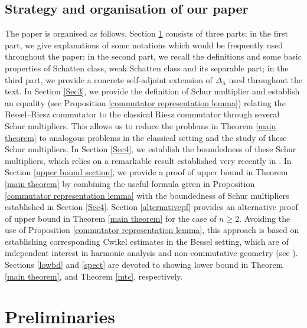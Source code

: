 \documentclass[12pt]{amsart}
\begin{document}
\subsection{Strategy and organisation of our paper}
The paper is organised as follows. Section \ref{Secpre} consists of three parts: in the first part, we give explanations of some notations which would be frequently used throughout the paper; in the second part, we recall the definitions and some basic properties of Schatten class, weak Schatten class and its separable part; in the third part, we provide a concrete self-adjoint extension of $\Delta_\lambda$ used throughout the text. In Section \ref{Sec3}, we provide the definition of Schur multiplier and establish an equality (see Proposition \ref{commutator representation lemma}) relating the Bessel--Riesz commutator to the classical Riesz commutator through several Schur multipliers. This allows us to reduce the problems in Theorem \ref{main theorem} to analogous problems in the classical setting and the study of these Schur multipliers. In Section \ref{Sec4}, we establish the boundedness of these Schur multipliers, which relies on a remarkable result established very recently in \cite[Theorem A]{MR4660138}. In Section \ref{upper bound section}, we provide a proof of upper bound in Theorem \ref{main theorem} by combining the useful formula given in Proposition \ref{commutator representation lemma} with the boundedness of Schur multipliers established in Section \ref{Sec4}. Section \ref{alternativepf} provides an alternative proof of upper bound in Theorem \ref{main theorem} for the case of $n\geq 2$. Avoiding the use of Proposition \ref{commutator representation lemma}, this approach is based on establishing corresponding Cwikel estimates in the Bessel setting, which are of independent interest in harmonic analysis and non-commutative geometry (see \cite{MR473576,LeSZ}). Sections \ref{lowbd} and \ref{spect} are devoted to showing lower bound in Theorem \ref{main theorem}, and Theorem \ref{mtc}, respectively.

\section{Preliminaries}\label{Secpre}
\setcounter{equation}{0}
\end{document}
